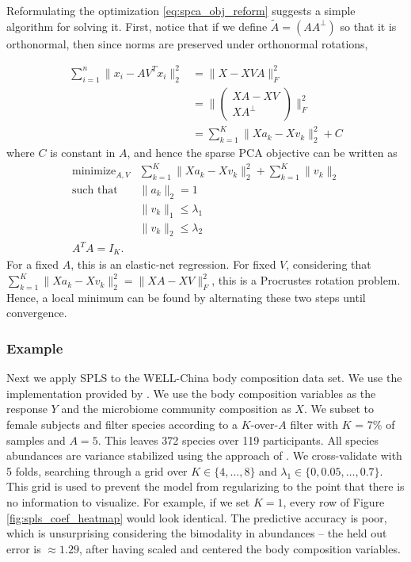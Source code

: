 \documentclass[14pt]{extarticle}
\begin{document}
Reformulating the optimization \ref{eq:spca_obj_reform} suggests a simple
algorithm for solving it. First, notice that if we define $\tilde{A} = \left(A
A^{\perp}\right)$ so that it is orthonormal, then since norms are preserved
under orthonormal rotations,

\begin{align*}
  \sum_{i = 1}^{n} \|x_i - AV^T x_i\|_2^2 &= \|X - XVA\|_{F}^2 \\
  &= \|\begin{pmatrix} XA - XV \\ XA^{\perp} \end{pmatrix} \|_{F}^2 \\
  &= \sum_{k = 1}^{K} \|Xa_k - X v_k\|_2^2 + C
\end{align*}
where $C$ is constant in $A$, and hence the sparse PCA objective can be written
as
\begin{align*}
  \text{minimize}_{A, V} &\sum_{k = 1}^{K} \|Xa_k - X v_k\|_2^2 + \sum_{k = 1}^{K} \|v_k\|_2 \\
  \text{such that }&\|a_k\|_2 = 1 \\
  & \|v_k\|_1 \leq \lambda_1 \\
  & \|v_k\|_2 \leq \lambda_2 \\
  A^TA = I_K.
\end{align*}
For a fixed $A$, this is an elastic-net regression. For fixed $V$, considering
that $\sum_{k = 1}^{K} \|Xa_k - Xv_k\|^2_2 = \|XA - XV\|_F^2$, this is a
Procrustes rotation problem. Hence, a local minimum can be found by alternating
these two steps until convergence.

\subsubsection{Example}
\label{subsubsec:spls_example}

Next we apply SPLS to the WELL-China body composition data set. We use the
implementation provided by \cite{chung2012spls}. We use the body composition
variables as the response $Y$ and the microbiome community composition as $X$.
We subset to female subjects and filter species according to a $K$-over-$A$
filter with $K$ = 7\% of samples and $A = 5$. This leaves 372 species over 119
participants. All species abundances are variance stabilized using the approach
of \cite{anders2010differential}. We cross-validate with 5 folds, searching
through a grid over $K \in \{4, \dots, 8\}$ and $\lambda_1 \in \{0, 0.05, \dots,
0.7\}$. This grid is used to prevent the model from regularizing to the point
that there is no information to visualize. For example, if we set $K = 1$, every
row of Figure \ref{fig:spls_coef_heatmap} would look identical. The predictive
accuracy is poor, which is unsurprising considering the bimodality in abundances
-- the held out error is $\approx 1.29$, after having scaled and centered the
body composition variables.
\end{document}
